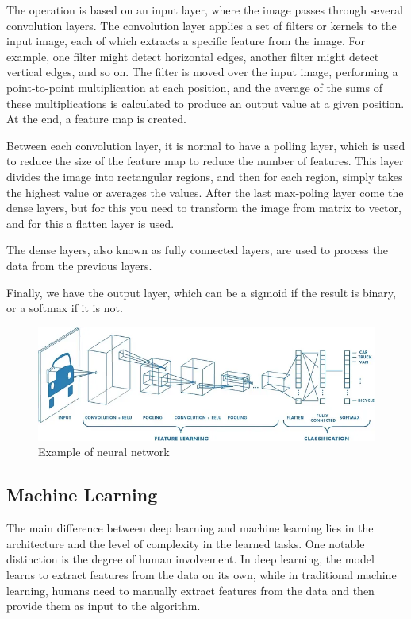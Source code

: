 The operation is based on an input layer, where the image passes through several convolution layers.
The convolution layer applies a set of filters or kernels to the input image, each of which extracts a specific feature from the image. For example, one filter might detect horizontal edges, another filter might detect vertical edges, and so on. The filter is moved over the input image, performing a point-to-point multiplication at each position, and the average of the sums of these multiplications is calculated to produce an output value at a given position. At the end, a feature map is created.

Between each convolution layer, it is normal to have a polling layer, which is used to reduce the size of the feature map to reduce the number of features. This layer divides the image into rectangular regions, and then for each region, simply takes the highest value or averages the values.
After the last max-poling layer come the dense layers, but for this you need to transform the image from matrix to vector, and for this a flatten layer is used.

The dense layers, also known as fully connected layers, are used to process the data from the previous layers.

Finally, we have the output layer, which can be a sigmoid if the result is binary, or a softmax if it is not.

\begin{figure}[H]
\centering
\includegraphics[width=15cm]{images/cnn.png}
\caption{Example of neural network \cite{mediumCNN}}
\end{figure}

\subsection{Machine Learning}
The main difference between deep learning and machine learning lies in the architecture and the level of complexity in the learned tasks. One notable distinction is the degree of human involvement. In deep learning, the model learns to extract features from the data on its own, while in traditional machine learning, humans need to manually extract features from the data and then provide them as input to the algorithm.

